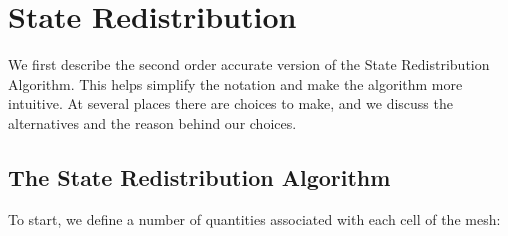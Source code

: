 \section{State Redistribution }\label{sec:srdAlg}

We first describe the second order accurate version of the State
Redistribution Algorithm. 
This helps simplify the notation and make the
algorithm more intuitive.   
At several places there are choices
to make, and we discuss the alternatives and the reason behind our
choices.  

\subsection{The State Redistribution Algorithm}

To start, we define a number of quantities associated with each cell of the mesh:

